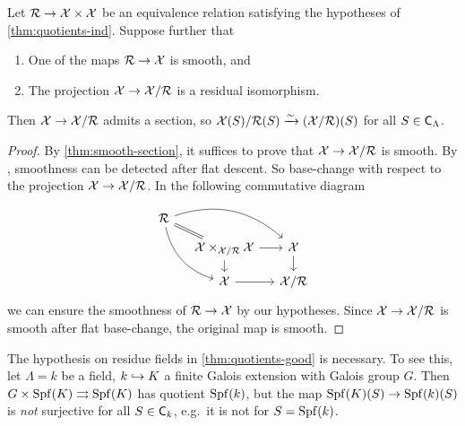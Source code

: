 \documentclass[phd,cornellheadings,draft]{cornell}
\begin{document}
\begin{corollary}\label{thm:quotients-good}
Let $\mathcal{R}\to \mathcal{X}\times \mathcal{X}$ be an equivalence relation satisfying the hypotheses 
of \ref{thm:quotients-ind}. Suppose further that 
\begin{enumerate}
\item
One of the maps $\mathcal{R}\to \mathcal{X}$ is smooth, and 

\item
The projection $\mathcal{X}\to \mathcal{X}/\mathcal{R}$ is a residual isomorphism. 
\end{enumerate}
Then $\mathcal{X}\to \mathcal{X}/\mathcal{R}$ admits a section, so $\mathcal{X}(S)/\mathcal{R}(S)\xrightarrow\sim (\mathcal{X}/\mathcal{R})(S)$ 
for all $S\in \mathsf{C}_\Lambda$. 
\end{corollary}
\begin{proof}
By \ref{thm:smooth-section}, it suffices to prove that $\mathcal{X}\to \mathcal{X}/\mathcal{R}$ is 
smooth. By \cite[17.7.3(ii)]{ega4-4}, smoothness can be detected after flat 
descent. So base-change with respect to the projection $\mathcal{X}\to \mathcal{X}/\mathcal{R}$. In the 
following commutative diagram 
\[
\begin{tikzcd}[column sep=small, row sep=small]
	\cR \ar[dr, equal] \ar[drr, bend left] \ar[ddr, bend right] \\
	& \cX\times_{\cX/\cR}\cX \ar[r] \ar[d]
		& \cX \ar[d] \\
	& \cX \ar[r]
		& \cX/\cR
\end{tikzcd}
\]
we can ensure the smoothness of $\mathcal{R}\to \mathcal{X}$ by our hypotheses. Since  
$\mathcal{X}\to \mathcal{X}/\mathcal{R}$ is smooth after flat base-change, the original map is smooth. 
\end{proof}

\begin{example}
The hypothesis on residue fields in \ref{thm:quotients-good} is necessary. To 
see this, let $\Lambda=k$ be a field, $k\hookrightarrow K$ a finite Galois extension 
with Galois group $G$. Then $G\times \operatorname{Spf}(K)\rightrightarrows \operatorname{Spf}(K)$ has 
quotient $\operatorname{Spf}(k)$, but the map $\operatorname{Spf}(K)(S)\to \operatorname{Spf}(k)(S)$ is \emph{not} 
surjective for all $S\in \mathsf{C}_k$, e.g.~it is not for $S=\operatorname{Spf}(k)$. 
\end{example}
\end{document}
